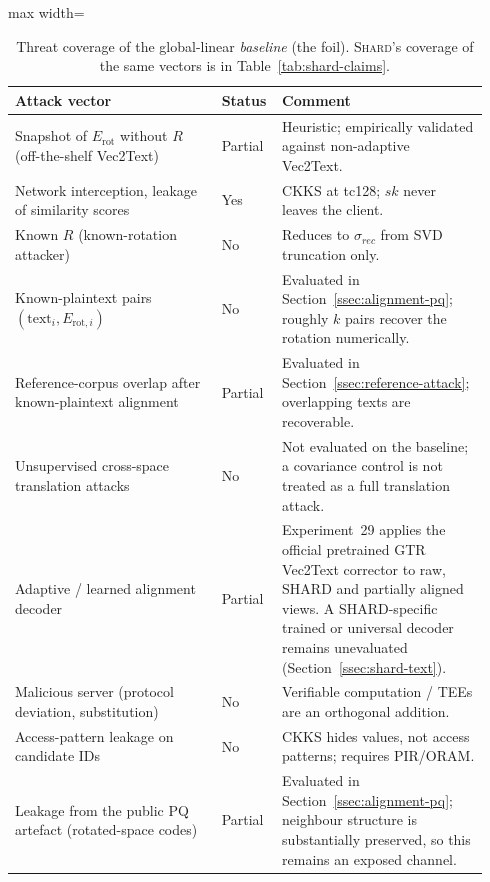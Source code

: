 \begin{table}[tbp]
\begin{singlespace}
\centering
\caption{Threat coverage of the global-linear \emph{baseline} (the foil).
\textsc{Shard}'s coverage of the same vectors is in
Table~\ref{tab:shard-claims}.}\label{tab:threat}
\small
\begin{adjustbox}{max width=\linewidth}
\begin{tabular}{@{}p{0.42\linewidth}p{0.10\linewidth}p{0.42\linewidth}@{}}
\toprule
\textbf{Attack vector} & \textbf{Status} & \textbf{Comment} \\ \midrule
Snapshot of $E_{\mathrm{rot}}$ without $R$ (off-the-shelf Vec2Text) &
Partial &
Heuristic; empirically validated against non-adaptive Vec2Text. \\
Network interception, leakage of similarity scores &
Yes &
CKKS at tc128; $sk$ never leaves the client. \\
Known $R$ (known-rotation attacker) &
No &
Reduces to $\sigma_{rec}$ from SVD truncation only. \\
Known-plaintext pairs $(\mathrm{text}_i, E_{\mathrm{rot},i})$ &
No &
Evaluated in Section~\ref{ssec:alignment-pq}; roughly $k$ pairs
recover the rotation numerically. \\
Reference-corpus overlap after known-plaintext alignment &
Partial &
Evaluated in Section~\ref{ssec:reference-attack}; overlapping texts are
recoverable. \\
Unsupervised cross-space translation attacks &
No &
Not evaluated on the baseline; a covariance control is not treated as a full
translation attack. \\
Adaptive / learned alignment decoder &
Partial &
Experiment~29 applies the official pretrained GTR Vec2Text corrector to raw,
SHARD and partially aligned views. A SHARD-specific trained or universal
decoder remains unevaluated (Section~\ref{ssec:shard-text}). \\
Malicious server (protocol deviation, substitution) &
No &
Verifiable computation / TEEs are an orthogonal addition. \\
Access-pattern leakage on candidate IDs &
No &
CKKS hides values, not access patterns; requires PIR/ORAM. \\
Leakage from the public PQ artefact (rotated-space codes) &
Partial &
Evaluated in Section~\ref{ssec:alignment-pq}; neighbour structure is
substantially preserved, so this remains an exposed channel. \\
\bottomrule
\end{tabular}
\end{adjustbox}
\end{singlespace}
\end{table}

